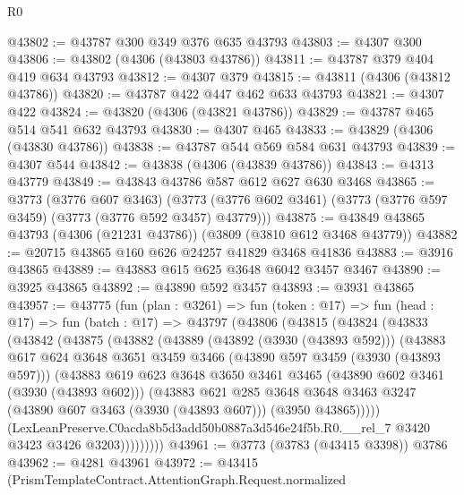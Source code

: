 \begin{lexlean}{R0}
\begin{coremodule}
@43802 := @43787 @300 @349 @376 @635 @43793
@43803 := @4307 @300
@43806 := @43802 (@4306 (@43803 @43786))
@43811 := @43787 @379 @404 @419 @634 @43793
@43812 := @4307 @379
@43815 := @43811 (@4306 (@43812 @43786))
@43820 := @43787 @422 @447 @462 @633 @43793
@43821 := @4307 @422
@43824 := @43820 (@4306 (@43821 @43786))
@43829 := @43787 @465 @514 @541 @632 @43793
@43830 := @4307 @465
@43833 := @43829 (@4306 (@43830 @43786))
@43838 := @43787 @544 @569 @584 @631 @43793
@43839 := @4307 @544
@43842 := @43838 (@4306 (@43839 @43786))
@43843 := @4313 @43779
@43849 := @43843 @43786 @587 @612 @627 @630 @3468
@43865 := @3773
    (@3776 @607 @3463)
    (@3773 (@3776 @602 @3461) (@3773 (@3776 @597 @3459) (@3773 (@3776 @592 @3457) @43779)))
@43875 := @43849 @43865 @43793 (@4306 (@21231 @43786)) (@3809 (@3810 @612 @3468 @43779))
@43882 := @20715 @43865 @160 @626 @24257 @41829 @3468 @41836
@43883 := @3916 @43865
@43889 := @43883 @615 @625 @3648 @6042 @3457 @3467
@43890 := @3925 @43865
@43892 := @43890 @592 @3457
@43893 := @3931 @43865
@43957 := @43775
    (fun (plan : @3261) =>
    fun (token : @17) =>
    fun (head : @17) =>
    fun (batch : @17) =>
    @43797
      (@43806
        (@43815
          (@43824
            (@43833
              (@43842
                (@43875
                  (@43882
                    (@43889
                      (@43892 (@3930 (@43893 @592)))
                      (@43883
                        @617
                        @624
                        @3648
                        @3651
                        @3459
                        @3466
                        (@43890 @597 @3459 (@3930 (@43893 @597)))
                        (@43883
                          @619
                          @623
                          @3648
                          @3650
                          @3461
                          @3465
                          (@43890 @602 @3461 (@3930 (@43893 @602)))
                          (@43883
                            @621
                            @285
                            @3648
                            @3648
                            @3463
                            @3247
                            (@43890 @607 @3463 (@3930 (@43893 @607)))
                            (@3950 @43865)))))
                    (LexLeanPreserve.C0acda8b5d3add50b0887a3d546e24f5b.R0.__rel_7
                      @3420
                      @3423
                      @3426
                      @3203)))))))))
@43961 := @3773 (@3783 (@43415 @3398)) @3786
@43962 := @4281 @43961
@43972 := @43415
    (PrismTemplateContract.AttentionGraph.Request.normalized

\end{coremodule}
\end{lexlean}
